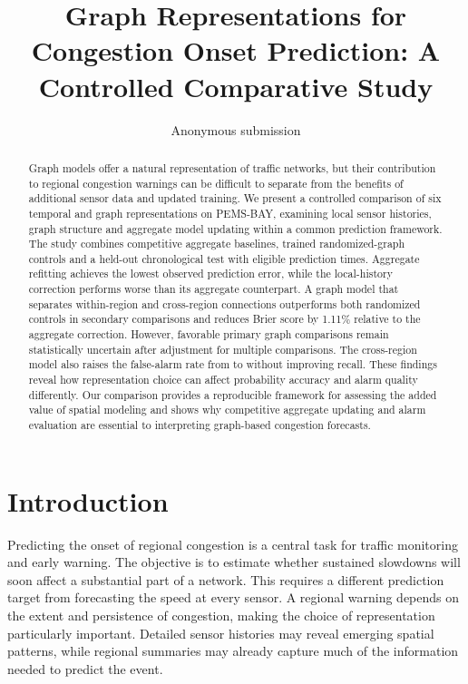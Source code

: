 \documentclass{llncs}
\begin{document}
\title{Graph Representations for Congestion Onset Prediction: A Controlled Comparative Study}
\author{Anonymous submission}
\institute{}
\maketitle
\begin{abstract}
Graph models offer a natural representation of traffic networks, but their contribution to regional congestion warnings can be difficult to separate from the benefits of additional sensor data and updated training. We present a controlled comparison of six temporal and graph representations on PEMS-BAY, examining local sensor histories, graph structure and aggregate model updating within a common prediction framework. The study combines competitive aggregate baselines, trained randomized-graph controls and a held-out chronological test with \TestOnsetN{} eligible prediction times. Aggregate refitting achieves the lowest observed prediction error, while the local-history correction performs worse than its aggregate counterpart. A graph model that separates within-region and cross-region connections outperforms both randomized controls in secondary comparisons and reduces Brier score by 1.11\% relative to the aggregate correction. However, favorable primary graph comparisons remain statistically uncertain after adjustment for multiple comparisons. The cross-region model also raises the false-alarm rate from \TestFprB{} to \TestFprE{} without improving recall. These findings reveal how representation choice can affect probability accuracy and alarm quality differently. Our comparison provides a reproducible framework for assessing the added value of spatial modeling and shows why competitive aggregate updating and alarm evaluation are essential to interpreting graph-based congestion forecasts.
\end{abstract}



\section{Introduction}

Predicting the onset of regional congestion is a central task for traffic monitoring and early warning. The objective is to estimate whether sustained slowdowns will soon affect a substantial part of a network. This requires a different prediction target from forecasting the speed at every sensor. A regional warning depends on the extent and persistence of congestion, making the choice of representation particularly important. Detailed sensor histories may reveal emerging spatial patterns, while regional summaries may already capture much of the information needed to predict the event.
\end{document}
